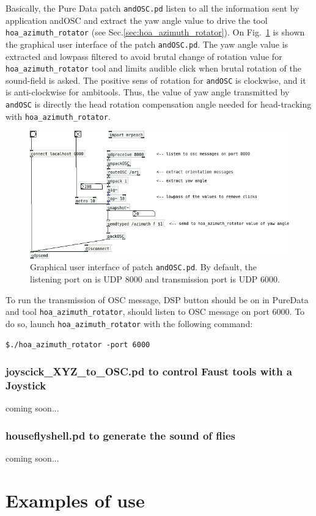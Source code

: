 \documentclass[10pt,a4paper]{article}
\begin{document}
Basically, the Pure Data patch \lstinline'andOSC.pd' listen to all the information sent by application andOSC and extract the yaw angle value to drive the tool \lstinline'hoa_azimuth_rotator' (see Sec.\ref{sec:hoa_azimuth_rotator}). On Fig.~\ref{fig:andOSC.pd} is shown the graphical user interface of the patch \lstinline'andOSC.pd'. The yaw angle value is extracted and lowpass filtered to avoid brutal change of rotation value for \lstinline'hoa_azimuth_rotator' tool and limits audible click when brutal rotation of the sound-field is asked. The positive sens of rotation for \lstinline'andOSC' is clockwise, and it is anti-clockwise for ambitools. Thus, the value of yaw angle transmitted by \lstinline'andOSC' is directly the head rotation compensation angle needed for head-tracking with \lstinline'hoa_azimuth_rotator'.
\begin{figure}
\centering
\includegraphics[width=0.7\columnwidth]{andOSC2.png}
\caption{Graphical user interface of patch \lstinline'andOSC.pd'. By default, the listening port on is UDP 8000 and transmission port is UDP 6000.}
\label{fig:andOSC.pd}
\end{figure}
To run the transmission of OSC message, DSP button should be on in PureData and tool \lstinline'hoa_azimuth_rotator', should listen to OSC message on port 6000. To do so, launch \lstinline'hoa_azimuth_rotator' with the following command:
\begin{lstlisting}
$./hoa_azimuth_rotator -port 6000
\end{lstlisting}

\pagebreak
\subsubsection{joyscick\_XYZ\_to\_OSC.pd to control Faust tools with a Joystick}
coming soon...
\subsubsection{houseflyshell.pd to generate the sound of flies}
coming soon...
\section{Examples of use}
\end{document}
